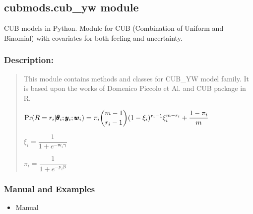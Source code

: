 \documentclass[letterpaper,10pt,english]{sphinxmanual}
\begin{document}
\subsection{cubmods.cub\_yw module}
\label{\detokenize{cubmods:module-cubmods.cub_yw}}\label{\detokenize{cubmods:cubmods-cub-yw-module}}
\sphinxAtStartPar
CUB models in Python.
Module for CUB (Combination of Uniform
and Binomial) with covariates
for both feeling and uncertainty.


\subsubsection{Description:}
\label{\detokenize{cubmods:id85}}\begin{quote}

\sphinxAtStartPar
This module contains methods and classes
for CUB\_YW model family.
It is based upon the works of Domenico
Piccolo et Al. and CUB package in R.

\sphinxAtStartPar
\(\Pr(R=r_i|\pmb{\theta}_i ; \pmb y_i ; \pmb w_i) = \pi_i \dbinom{m-1}{r_i-1}(1-\xi_i)^{r_i-1}\xi_i^{m-r_i}+\dfrac{1-\pi_i}{m}\)

\sphinxAtStartPar
\(\xi_i = \dfrac{1}{1+e^{-\pmb w_i \pmb\gamma}}\)

\sphinxAtStartPar
\(\pi_i = \dfrac{1}{1+e^{-\pmb y_i \pmb\beta}}\)
\end{quote}


\subsubsection{Manual and Examples}
\label{\detokenize{cubmods:id86}}\begin{itemize}
\item {} 
\sphinxAtStartPar
Manual 

\end{itemize}
\end{document}
